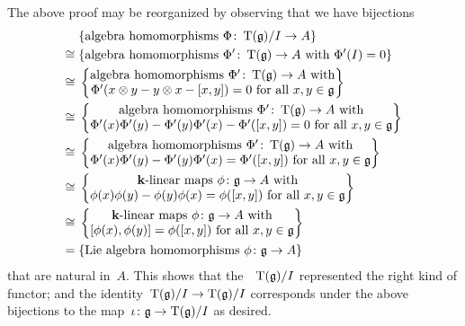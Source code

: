 \begin{remark}
  The above proof may be reorganized by observing that we have bijections
  \begin{align*}
    {}&
    \{ \text{algebra homomorphisms~$\Phi \colon \Tensor(\glie)/I \to A$} \}
    \\
    \cong{}&
    \{ \text{algebra homomorphisms~$\Phi' \colon \Tensor(\glie) \to A$ with~$\Phi'(I) = 0$} \}
    \\
    \cong{}&
    \left\{
      \begin{tabular}{@{}c@{}}
        algebra homomorphisms~$\Phi' \colon \Tensor(\glie) \to A$ with  \\
        $\Phi'(x \tensor y - y \tensor x - [x,y]) = 0$ for all~$x, y \in \glie$
      \end{tabular}
    \right\}
    \\
    \cong{}&
    \left\{
      \begin{tabular}{@{}c@{}}
        algebra homomorphisms~$\Phi' \colon \Tensor(\glie) \to A$ with  \\
        $\Phi'(x) \Phi'(y) - \Phi'(y) \Phi'(x) - \Phi'([x,y]) = 0$ for all~$x, y \in \glie$
      \end{tabular}
    \right\}
    \\
    \cong{}&
    \left\{
      \begin{tabular}{@{}c@{}}
        algebra homomorphisms~$\Phi' \colon \Tensor(\glie) \to A$ with  \\
        $\Phi'(x) \Phi'(y) - \Phi'(y) \Phi'(x) = \Phi'([x,y])$ for all~$x, y \in \glie$
      \end{tabular}
    \right\}
    \\
    \cong{}&
    \left\{
      \begin{tabular}{@{}c@{}}
        {\linear{$\kf$}} maps~$\phi \colon \glie \to A$ with  \\
        $\phi(x) \phi(y) - \phi(y) \phi(x) = \phi([x,y])$ for all~$x, y \in \glie$
      \end{tabular}
    \right\}
    \\
    \cong{}&
    \left\{
      \begin{tabular}{@{}c@{}}
        {\linear{$\kf$}} maps~$\phi \colon \glie \to A$ with  \\
        $[\phi(x), \phi(y)] = \phi([x,y])$ for all~$x, y \in \glie$ 
      \end{tabular}
    \right\}
    \\
    ={}&
    \{ \text{Lie~algebra homomorphisms~$\phi \colon \glie \to A$} \}
  \end{align*}
  that are natural in~$A$.
  This shows that the~{\algebra{$\kf$}}~$\operatorname{T}(\mathfrak{g})/I$ represented the right kind of functor;
  and the identity~$\operatorname{T}(\mathfrak{g})/I \to \operatorname{T}(\mathfrak{g})/I$ corresponds under the above bijections to the map~$\iota \colon \mathfrak{g} \to \operatorname{T}(\mathfrak{g})/I$ as desired.
\end{remark}


